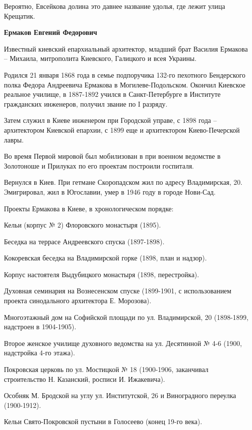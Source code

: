 Вероятно, Евсейкова долина это давнее название удолья, где лежит улица Крещатик.\\

\medskip


\textbf{Ермаков Евгений Федорович} 

Известный киевский епархиальный архитектор, младший брат Василия Ермакова – Михаила, митрополита Киевского, Галицкого и всея Украины.

Родился  21 января 1868 года в семье подпоручика 132-го пехотного Бендерского полка Федора Андреевича Ермакова в Могилеве-Подольском. Окончил Киевское реальное училище, в 1887-1892 учился в Санкт-Петербурге в Институте гражданских инженеров, получил звание по I разряду.

Затем служил в Киеве инженером при Городской управе, с 1898 года – архитектором Киевской епархии, с 1899 еще и архитектором Киево-Печерской лавры.

Во время Первой мировой был мобилизован в при военном ведомстве в Золотоноше и Прилуках по его проектам построили госпиталя.

Вернулся в Киев. При гетмане Скоропадском жил по адресу Владимирская, 20. Эмигрировал, жил в Югославии, умер в 1946 году в городе Нови-Сад.

Проекты Ермакова в Киеве, в хронологическом порядке:

Кельи (корпус № 2) Флоровского монастыря (1895).

Беседка на террасе Андреевского спуска (1897-1898).

Кокоревская беседка на Владимирской горке (1898, план и надзор).

Корпус настоятеля Выдубицкого монастыря (1898, перестройка).

Духовная семинария на Вознесенском спуске (1899-1901, с использованием проекта синодального архитектора Е. Морозова).

Многоэтажный дом на Софийской площади по ул. Владимирской, 20 (1898-1899, надстроен в 1904-1905).

Второе женское училище духовного ведомства на ул. Десятинной № 4-6 (1900, надстройка 4-го этажа).

Покровская церковь по ул. Мостицкой № 18 (1900-1906, заканчивал строительство Н. Казанский, росписи И. Ижакевича).

Особняк М. Бродской на углу ул. Институтской, 26 и Виноградного переулка (1900-1912).

Кельи Свято-Покровской пустыни в Голосеево (конец 19-го века).

